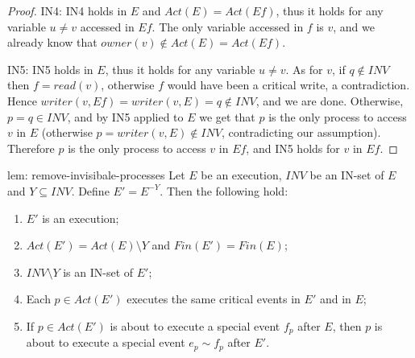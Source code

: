 \begin{proof}
	IN4: IN4 holds in $E$ and $Act(E) = Act(E f)$, thus it holds for any variable $u \neq v$ accessed in $E f$. The only variable accessed in $f$ is $v$, and we already know that $owner(v) \notin Act(E) = Act(E f)$.
	
	IN5: IN5 holds in $E$, thus it holds for any variable $u \neq v$. As for $v$, if $q \notin INV$ then $f=read(v)$, otherwise $f$ would have been a critical write, a contradiction. Hence $writer(v,Ef) = writer(v,E) = q \notin INV$, and we are done. Otherwise, $p = q \in INV$, and by IN5 applied to $E$ we get that $p$ is the only process to access $v$ in $E$ (otherwise $p = writer(v,E) \notin INV$, contradicting our assumption). Therefore $p$ is the only process to access $v$ in $E f$, and IN5 holds for $v$ in $E f$.
\end{proof}


\begin{lemma-repeat} {lem: remove-invisibale-processes}
	Let $E$ be an execution, $\mathit{INV}$ be an IN-set of $E$ and $Y \subseteq \mathit{INV}$.
	\newline Define $E' = E^{-Y}$. Then the following hold:
	\begin{enumerate}
		\item $E'$ is an execution;
		\item $Act(E') = Act(E) \setminus Y$ and $Fin(E') = Fin(E)$;
		\item $\mathit{INV} \setminus Y$ is an IN-set of $E'$;
		\item Each $p \in Act(E')$ executes the same critical events in $E'$ and in $E$;
		\item If $p \in Act(E')$ is about to execute a special event $f_p$ after $E$, then $p$ is about to execute a special event $e_p \sim f_p$ after $E'$.
	\end{enumerate}
\end{lemma-repeat}


